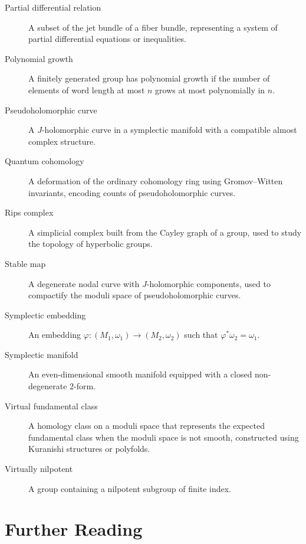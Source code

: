 \begin{description}
    \item[Partial differential relation] A subset of the jet bundle of a fiber bundle, representing a system of partial differential equations or inequalities.
    \item[Polynomial growth] A finitely generated group has polynomial growth if the number of elements of word length at most \(n\) grows at most polynomially in \(n\).
    \item[Pseudoholomorphic curve] A \(J\)-holomorphic curve in a symplectic manifold with a compatible almost complex structure.
    \item[Quantum cohomology] A deformation of the ordinary cohomology ring using Gromov--Witten invariants, encoding counts of pseudoholomorphic curves.
    \item[Rips complex] A simplicial complex built from the Cayley graph of a group, used to study the topology of hyperbolic groups.
    \item[Stable map] A degenerate nodal curve with \(J\)-holomorphic components, used to compactify the moduli space of pseudoholomorphic curves.
    \item[Symplectic embedding] An embedding \(\varphi: (M_1, \omega_1) \to (M_2, \omega_2)\) such that \(\varphi^*\omega_2 = \omega_1\).
    \item[Symplectic manifold] An even-dimensional smooth manifold equipped with a closed non-degenerate 2-form.
    \item[Virtual fundamental class] A homology class on a moduli space that represents the expected fundamental class when the moduli space is not smooth, constructed using Kuranishi structures or polyfolds.
    \item[Virtually nilpotent] A group containing a nilpotent subgroup of finite index.
\end{description}

\section*{Further Reading}

